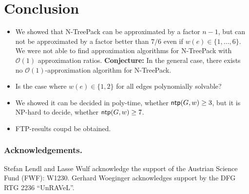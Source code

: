 \documentclass[runningheads]{llncs}
\newcommand{\set}[1]{\{ #1 \}}
\newcommand{\fromto}[2]{\set{#1, \ldots, #2}}
\newcommand{\bigO}{\mathcal{O}}
\DeclareMathOperator{\ntp}{\text{\sf ntp}}
\newcommand{\xxxNTP}{{\sc N-TreePack}}
\begin{document}
\section{Conclusion}
\label{sec:conclusion}

\begin{itemize}
\item  We showed that {\xxxNTP} can be approximated by a factor $n-1$, but can not be approximated 
by a factor better than $7/6$ even if $w(e) \in \fromto{1}{6}$. 
We were not able to find approximation algorithms for {\xxxNTP} with $\bigO(1)$ approximation ratios. 
\textbf{Conjecture:} In the general case, there exists no $\bigO(1)$-approximation algorithm for {\xxxNTP}.
\item Is the case where $w(e) \in \set{1, 2}$ for all edges polynomially solvable?
\item We showed it can  be decided in poly-time, whether $\ntp(G, w) \geq 3$, but it is NP-hard to decide, whether $\ntp(G, w) \geq 7$. 
\item FTP-results coupd be obtained.
\end{itemize}


\subsubsection*{Acknowledgements.}

Stefan Lendl and Lasse Wulf acknowledge the support of the Austrian Science Fund (FWF): W1230.
Gerhard Woeginger acknowledges support by the DFG RTG 2236 ``UnRAVeL''.

%
%





\appendix
\end{document}
